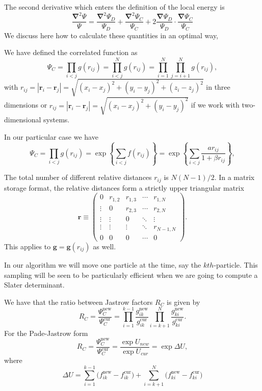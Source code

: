 \documentclass[graybox,sectrefs,envcountresetchap,open=right]{svmonodo}
\begin{document}
The second derivative which enters the definition of the local energy is 
\[
\frac{\mathbf{\nabla}^2 \Psi}{\Psi}=\frac{\mathbf{\nabla}^2 \Psi_{D}}{\Psi_{D}} + \frac{\mathbf{\nabla}^2  \Psi_C}{ \Psi_C} + 2 \frac{\mathbf{\nabla}  \Psi_{D}}{\Psi_{D}}\cdot\frac{\mathbf{\nabla}   \Psi_C}{ \Psi_C}
\]
We discuss here how to calculate these quantities in an optimal way,




We have defined the correlated function as
\[
\Psi_C=\prod_{i< j}g(r_{ij})=\prod_{i< j}^Ng(r_{ij})= \prod_{i=1}^N\prod_{j=i+1}^Ng(r_{ij}),
\]
with 
$r_{ij}=|\mathbf{r}_i-\mathbf{r}_j|=\sqrt{(x_i-x_j)^2+(y_i-y_j)^2+(z_i-z_j)^2}$ in three dimensions or
$r_{ij}=|\mathbf{r}_i-\mathbf{r}_j|=\sqrt{(x_i-x_j)^2+(y_i-y_j)^2}$ if we work with two-dimensional systems.

In our particular case we have
\[
\Psi_C=\prod_{i< j}g(r_{ij})=\exp{\left\{\sum_{i<j}f(r_{ij})\right\}}=
\exp{\left\{\sum_{i<j}\frac{ar_{ij}}{1+\beta r_{ij}}\right\}},
\]







The total number of different relative distances $r_{ij}$ is $N(N-1)/2$. In a matrix storage format, the relative distances  form a strictly upper triangular matrix
\[
 \mathbf{r} \equiv \begin{pmatrix}
  0 & r_{1,2} & r_{1,3} & \cdots & r_{1,N} \\
  \vdots & 0       & r_{2,3} & \cdots & r_{2,N} \\
  \vdots & \vdots  & 0  & \ddots & \vdots  \\
  \vdots & \vdots  & \vdots  & \ddots  & r_{N-1,N} \\
  0 & 0  & 0  & \cdots  & 0
 \end{pmatrix}.
\]
This applies to  $\mathbf{g} = \mathbf{g}(r_{ij})$ as well. 

In our algorithm we will move one particle  at the time, say the $kth$-particle.  This sampling will be seen to be particularly efficient when we are going to compute a Slater determinant. 




We have that the ratio between Jastrow factors $R_C$ is given by
\[
R_{C} = \frac{\Psi_{C}^\mathrm{new}}{\Psi_{C}^\mathrm{cur}} =
\prod_{i=1}^{k-1}\frac{g_{ik}^\mathrm{new}}{g_{ik}^\mathrm{cur}}
\prod_{i=k+1}^{N}\frac{ g_{ki}^\mathrm{new}} {g_{ki}^\mathrm{cur}}.
\]
For the Pade-Jastrow form
\[
 R_{C} = \frac{\Psi_{C}^\mathrm{new}}{\Psi_{C}^\mathrm{cur}} = 
\frac{\exp{U_{new}}}{\exp{U_{cur}}} = \exp{\Delta U},
\]
where
\[
\Delta U =
\sum_{i=1}^{k-1}\big(f_{ik}^\mathrm{new}-f_{ik}^\mathrm{cur}\big)
+
\sum_{i=k+1}^{N}\big(f_{ki}^\mathrm{new}-f_{ki}^\mathrm{cur}\big)
\]
\end{document}
